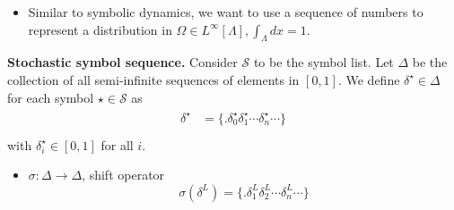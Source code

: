 \documentclass[12pt,t]{beamer}
\begin{document}
\begin{frame}
\begin{itemize}\setlength{\parskip}{0pt}  \setlength{\itemsep}{5pt} \setlength{\topsep}{0pt}
    \item Similar to symbolic dynamics, we want to use a sequence of numbers to represent a distribution in
          $\Omega \in L^{\infty}[\Lambda], \int_{\Lambda}dx=1 $.
\end{itemize}

\begin{definition} \textbf{Stochastic symbol sequence.}
Consider $\mathcal{S}$ to be the symbol list. Let $\Delta$ be the collection of all
semi-infinite sequences of elements in $[0,1]$. We define $\delta^\star \in \Delta$ for each
symbol $\star \in \mathcal{S}$ as
 \begin{align}
 \begin{split}
 \delta^\star &= \{.\delta_0^\star \delta_1^\star\cdots \delta_n^\star\cdots\} \\
 \end{split}
 \end{align}
with $\delta^\star_i \in [0,1]$ for all $i$.
\end{definition}
\begin{itemize}\setlength{\parskip}{0pt}  \setlength{\itemsep}{5pt} \setlength{\topsep}{0pt}
  \item $\sigma: \Delta \rightarrow \Delta $, shift operator
    $$\sigma(\delta^L)= \{.\delta^L_1\delta^L_2\cdots
           \delta^L_n\cdots\}$$
\end{itemize}

\end{frame}
\end{document}
